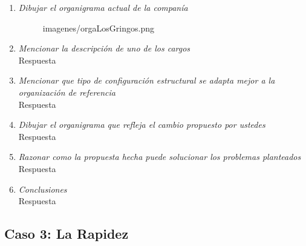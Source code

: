 \documentclass[a4paper,10pt]{article}
\begin{document}
\begin{enumerate}
			\item \textit{Dibujar el organigrama actual de la companía}\\
			\begin{figure}[!h]
			\caption[width=0.15\textwidth]{imagenes/orgaLosGringos.png}
			\end{figure}
			\newpage			
			\item \textit{Mencionar la descripción de uno de los cargos}\\
			Respuesta
						
			\item \textit{Mencionar que tipo de configuración estructural se adapta mejor a la organización de referencia}\\
			Respuesta
						
			\item \textit{Dibujar el organigrama que refleja el cambio propuesto por ustedes}\\
			Respuesta
						
			\item \textit{Razonar como la propuesta hecha puede solucionar los problemas planteados}\\
			Respuesta
			
			\item \textit{Conclusiones}\\
			Respuesta
			
			\end{enumerate}
		
	\subsection{Caso 3: La Rapidez}
\end{document}
